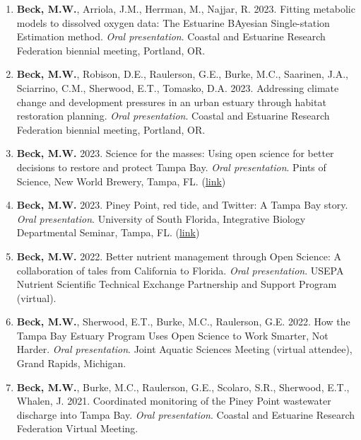 \documentclass[letterpaper,12pt]{article}
\begin{document}
\begin{enumerate}

\item {\bf Beck, M.W.}, Arriola, J.M., Herrman, M., Najjar, R. 2023. Fitting metabolic models to dissolved oxygen data: The Estuarine BAyesian Single-station Estimation method. \textit{Oral presentation}. Coastal and Estuarine Research Federation biennial meeting, Portland, OR. 

\item {\bf Beck, M.W.}, Robison, D.E., Raulerson, G.E., Burke, M.C., Saarinen, J.A., Sciarrino, C.M., Sherwood, E.T., Tomasko, D.A. 2023. Addressing climate change and development pressures in an urban estuary through habitat restoration planning. \textit{Oral presentation}. Coastal and Estuarine Research Federation biennial meeting, Portland, OR. 

\item {\bf Beck, M.W.} 2023. Science for the masses: Using open science for better decisions to restore and protect Tampa Bay. \textit{Oral presentation}. Pints of Science, New World Brewery, Tampa, FL. ({\footnotesize\href{https://docs.google.com/presentation/d/1cphkJnifIwnk3-j4yLB2qkYiJl0wLnk5hqOFqnm0aDU/edit?usp=sharing}{link}})

\item {\bf Beck, M.W.} 2023. Piney Point, red tide, and Twitter: A Tampa Bay story. \textit{Oral presentation}. University of South Florida, Integrative Biology Departmental Seminar, Tampa, FL. ({\footnotesize\href{https://docs.google.com/presentation/d/1yfXyuxaXU2CPLWnhtApxDpyS_xuhm9fh29jPpw6MaHE/edit?usp=share_link}{link}})

\item {\bf Beck, M.W.} 2022. Better nutrient management through Open Science: A collaboration of tales from California to Florida. \textit{Oral presentation}. USEPA Nutrient Scientific Technical Exchange Partnership and Support Program (virtual).  

\item {\bf Beck, M.W.}, Sherwood, E.T., Burke, M.C., Raulerson, G.E. 2022. How the Tampa Bay Estuary Program Uses Open Science to Work Smarter, Not Harder. \textit{Oral presentation}. Joint Aquatic Sciences Meeting (virtual attendee), Grand Rapids, Michigan. 

\item {\bf Beck, M.W.}, Burke, M.C., Raulerson, G.E., Scolaro, S.R., Sherwood, E.T., Whalen, J. 2021. Coordinated monitoring of the Piney Point wastewater discharge into Tampa Bay. \textit{Oral presentation}. Coastal and Estuarine Research Federation Virtual Meeting.


\end{enumerate}
\end{document}
